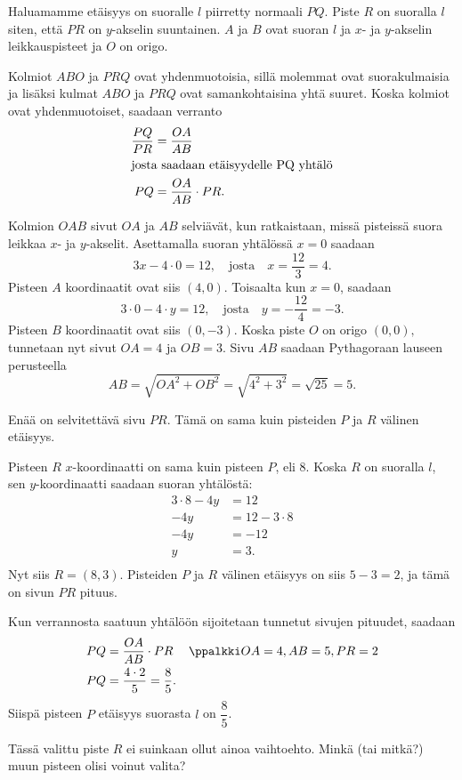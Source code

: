 Haluamamme etäisyys on suoralle $l$ piirretty normaali $PQ$. Piste $R$ on suoralla $l$ siten, että $PR$ on $y$-akselin suuntainen. $A$ ja $B$ ovat suoran $l$ ja $x$- ja $y$-akselin leikkauspisteet ja $O$ on origo.

Kolmiot $ABO$ ja $PRQ$ ovat yhdenmuotoisia, sillä molemmat ovat suorakulmaisia ja lisäksi kulmat $ABO$ ja $PRQ$ ovat samankohtaisina yhtä suuret. Koska kolmiot ovat yhdenmuotoiset, saadaan verranto
\begin{align*}
\frac{PQ}{PR} &=\frac{OA}{AB}\\
\intertext{josta saadaan etäisyydelle PQ yhtälö}
PQ &=\frac{OA}{AB}\cdot PR.
\end{align*}

Kolmion $OAB$ sivut $OA$ ja $AB$ selviävät, kun ratkaistaan, missä pisteissä suora leikkaa $x$- ja $y$-akselit.
Asettamalla suoran yhtälössä $x=0$ saadaan
\[
3x-4\cdot 0=12, \quad \text{josta} \quad x=\frac{12}{3}=4.
\]
Pisteen $A$ koordinaatit ovat siis $(4, 0)$. Toisaalta kun $x=0$, saadaan
\[
3\cdot 0-4\cdot y=12, \quad \text{josta} \quad y=-\frac{12}{4}=-3.
\]
Pisteen $B$ koordinaatit ovat siis $(0, -3)$. Koska piste $O$ on origo $(0,0),$ tunnetaan nyt sivut $OA=4$ ja $OB=3$. Sivu $AB$ saadaan Pythagoraan lauseen perusteella
\[
AB=\sqrt{OA^2+OB^2}=\sqrt{4^2+3^2}=\sqrt{25}=5.
\]

Enää on selvitettävä sivu $PR$. Tämä on sama kuin pisteiden $P$ ja $R$ välinen etäisyys.

Pisteen $R$ $x$-koordinaatti on sama kuin pisteen $P$, eli 8. Koska $R$ on suoralla $l$, sen $y$-koordinaatti saadaan suoran yhtälöstä:
\begin{align*}
3\cdot 8-4y & =12 \\
-4y & =12-3\cdot 8 \\
-4y & =-12 \\
y & =3. \\
\end{align*}
Nyt siis $R=(8, 3)$. Pisteiden $P$ ja $R$ välinen etäisyys on siis $5-3=2$, ja tämä on sivun $PR$ pituus.

Kun verrannosta saatuun yhtälöön sijoitetaan tunnetut sivujen pituudet, saadaan
\begin{align*}
PQ &=\frac{OA}{AB}\cdot PR  && \ppalkki OA= 4, AB=5, PR= 2\\
PQ & =\frac{4\cdot 2}{5} = \frac{8}{5}.
\end{align*}
Siispä pisteen $P$ etäisyys suorasta $l$ on $\dfrac{8}{5}$.

Tässä valittu piste $R$ ei suinkaan ollut ainoa vaihtoehto. Minkä (tai mitkä?) muun pisteen olisi voinut valita?




